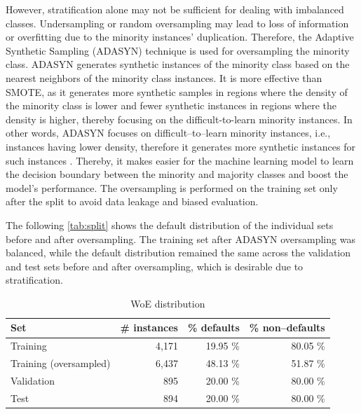         However, stratification alone may not be sufficient for dealing with imbalanced classes.
        Undersampling or random oversampling may lead to loss of information or overfitting due to the minority instances' duplication.
        Therefore, the Adaptive Synthetic Sampling (ADASYN) technique is used for oversampling the minority class.
        ADASYN generates synthetic instances of the minority class based on the nearest neighbors of the minority class instances.
        It is more effective than SMOTE, as it generates more synthetic samples in regions where the density of the minority class is lower and fewer synthetic instances in regions where the density is higher, thereby focusing on the difficult-to-learn minority instances.
        In other words, ADASYN focuses on difficult--to--learn minority instances, i.e., instances having lower density, therefore it generates more synthetic instances for such instances \citep{adasynhaibo}.
        Thereby, it makes easier for the machine learning model to learn the decision boundary between the minority and majority classes and boost the model's performance. 
        The oversampling is performed on the training set only after the split to avoid data leakage and biased evaluation.
        
        The following \autoref{tab:split} shows the default distribution of the individual sets before and after oversampling. The training set after ADASYN oversampling was balanced, while the default distribution remained the same across the validation and test sets before and after oversampling, which is desirable due to stratification.
        
        \begin{table}[H]
            \small
            \setlength{\tabcolsep}{8pt}
            \renewcommand{\arraystretch}{1.3}
            \centering
                \caption[WoE distribution]{WoE distribution}\label{tab:split}
                \begin{tabular}{lrrr}
            \toprule
            \textbf{Set} & \textbf{\# instances} & \textbf{\% defaults} & \textbf{\% non--defaults}\\
            \midrule
            \hline
            Training & 4,171  & 19.95 \% & 80.05 \% \\
            Training (oversampled) & 6,437 &  48.13 \% & 51.87 \% \\
        
            Validation & 895 &  20.00 \% & 80.00 \% \\
        
            Test & 894 &  20.00 \% & 80.00 \% \\
            \bottomrule
            \end{tabular}
            \vspace{0.7em}
        
            \vspace{-1em}
        \end{table}
        
